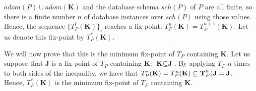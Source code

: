 \documentclass{pracamgr}
\theoremstyle{plain}
\theoremstyle{definition}
\theoremstyle{remark}
\begin{document}
$adom(P) \cup adom(\textbf{K})$ and the database schema $sch(P)$ of $P$ are all finite, so there is a finite number $n$ of database instances over $sch(P)$ using those values. Hence, the sequence $\{T_P^i(\textbf{K})\}_i$ reaches a fix-point: $T_P^n(\textbf{K}) = T_P^{n+1}(\textbf{K})$. Let us denote this fix-point by $T_P^*(\textbf{K})$.

We will now prove that this is the minimum fix-point of $T_P$ containing $\textbf{K}$. Let us suppose that $\textbf{J}$ is a fix-point of $T_P$ containing  $\textbf{K}$:  $\textbf{K} \subseteq \textbf{J}$. By applying $T_P$ $n$ times to both sides of the inequality, we have that $T_P^*(\textbf{K}) = T_P^n(\textbf{K}) \subseteq \textbf T_P^n(\textbf{J} = \textbf{J}$. Hence, $T_P^*(\textbf{K})$ is the minimum fix-point of $T_P$ containing $\textbf{K}$.
\end{document}
